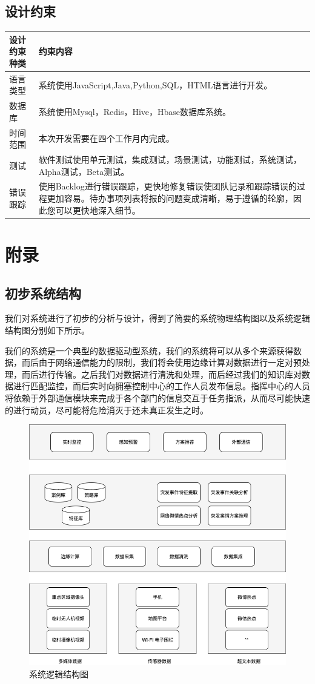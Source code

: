 \documentclass{ctexrep}
\begin{document}
\section{设计约束}
\begin{longtable}{p{2cm}|p{10cm}}
	\hline
	设计约束种类 & 约束内容 \\
	\hline
	\hline
	语言类型& 系统使用JavaScript,Java,Python,SQL，HTML语言进行开发。\\
	\hline
	数据库 & 系统使用Mysql，Redis，Hive，Hbase数据库系统。 \\
	\hline
	时间范围 & 本次开发需要在四个工作月内完成。\\
	\hline
	测试 & 软件测试使用单元测试，集成测试，场景测试，功能测试，系统测试，Alpha测试，Beta测试。\\
	\hline
	错误跟踪 & 使用Backlog进行错误跟踪，更快地修复错误使团队记录和跟踪错误的过程更加容易。待办事项列表将报的问题变成清晰，易于遵循的轮廓，因此您可以更快地深入细节。\\
	\hline
	\end{longtable}
\chapter{附录}
\section{初步系统结构}
我们对系统进行了初步的分析与设计，得到了简要的系统物理结构图以及系统逻辑结构图分别如下所示。

我们的系统是一个典型的数据驱动型系统，我们的系统将可以从多个来源获得数据，而后由于网络通信能力的限制，我们将会使用边缘计算对数据进行一定对预处理，而后进行传输。之后我们对数据进行清洗和处理，而后经过我们的知识库对数据进行匹配监控，而后实时向拥塞控制中心的工作人员发布信息。指挥中心的人员将依赖于外部通信模块来完成于各个部门的信息交互于任务指派，从而尽可能快速的进行动员，尽可能将危险消灭于还未真正发生之时。
\begin{figure}[H]
	\centering
	\includegraphics[scale=0.4]{img/logical.png}
	\caption{系统逻辑结构图}
\end{figure}
\end{document}
